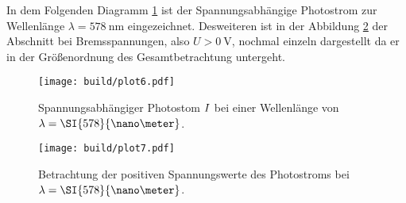 In dem Folgenden Diagramm \ref{fig:1} ist der Spannungsabhängige Photostrom zur Wellenlänge $\lambda = \SI{578}{\nano\meter}$ eingezeichnet. Desweiteren ist in der Abbildung \ref{fig:2} der Abschnitt bei Bremsspannungen, also $U > \SI{0}{\volt}$, nochmal einzeln dargestellt
da er in der Größenordnung des Gesamtbetrachtung untergeht.

\begin{figure}
    \centering
    \texttt{[image: build/plot6.pdf]}
    \caption{Spannungsabhängiger Photostom $\protect I$ bei einer Wellenlänge von $\protect \lambda = \SI{578}{\nano\meter}$.} 
    \label{fig:1}
\end{figure}

\begin{figure}
    \centering
    \texttt{[image: build/plot7.pdf]}
    \caption{Betrachtung der positiven Spannungswerte des Photostroms bei $\protect \lambda = \SI{578}{\nano\meter}$. } 
    \label{fig:2}
\end{figure}

